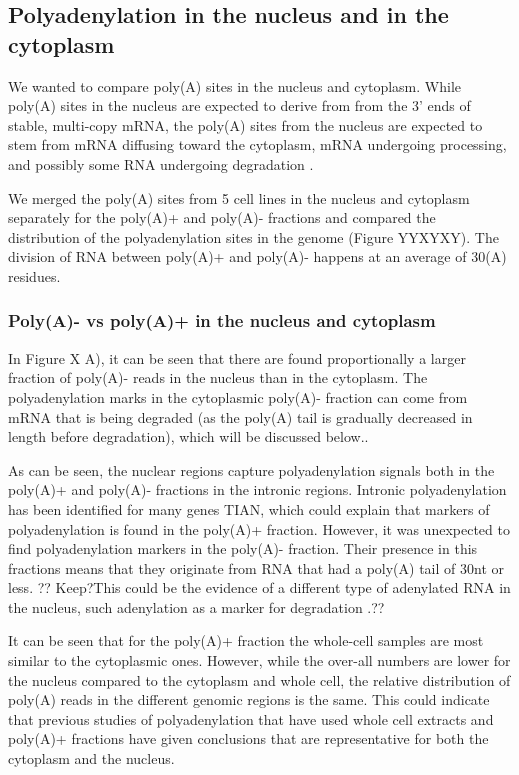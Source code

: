 \documentclass[a4paper]{article}
\begin{document}
\subsection{Polyadenylation in the nucleus and in the cytoplasm}

We wanted to compare poly(A) sites in the nucleus and cytoplasm. While poly(A)
sites in the nucleus are expected to derive from from the 3' ends of stable,
multi-copy mRNA, the poly(A) sites from the nucleus are expected to stem from
mRNA diffusing toward the cytoplasm, mRNA undergoing processing, and possibly
some RNA undergoing degradation
\cite{shcherbik_polyadenylation_2010,slomovic_addition_2010}.

We merged the poly(A) sites from 5 cell lines in the nucleus and cytoplasm
separately for the poly(A)+ and poly(A)- fractions and
compared the distribution of the polyadenylation sites in the genome (Figure
YYXYXY). The division of RNA between poly(A)+ and poly(A)- happens at an
average of 30(A) residues.

\subsubsection{Poly(A)- vs poly(A)+ in the nucleus and cytoplasm}
In Figure X A), it can be seen that there are found proportionally a larger
fraction of poly(A)- reads in the nucleus than in the cytoplasm.
The polyadenylation marks in the cytoplasmic poly(A)- fraction can
come from mRNA that is being degraded (as the poly(A) tail is gradually
decreased in length before degradation), which will be discussed below..

As can be seen, the nuclear regions capture polyadenylation signals both in the
poly(A)+ and poly(A)- fractions in the intronic regions. Intronic
polyadenylation has been identified for many genes \cite{}TIAN, which could
explain that markers of polyadenylation is found in the poly(A)+ fraction.
However, it was unexpected to find polyadenylation markers in the poly(A)-
fraction. Their presence in this fractions means that they originate from RNA
that had a poly(A) tail of 30nt or less. ?? Keep?This could be the evidence of a
different type of adenylated RNA in the nucleus, such adenylation as a marker
for degradation \cite{}.??

It can be seen that for the poly(A)+ fraction the whole-cell samples are most
similar to the cytoplasmic ones. However, while the over-all numbers are lower for
the nucleus compared to the cytoplasm and whole cell, the relative distribution of
poly(A) reads in the different genomic regions is the same. This could indicate that
previous studies of polyadenylation that have used whole cell extracts and
poly(A)+ fractions have given conclusions that are representative for both the
cytoplasm and the nucleus.
\end{document}
